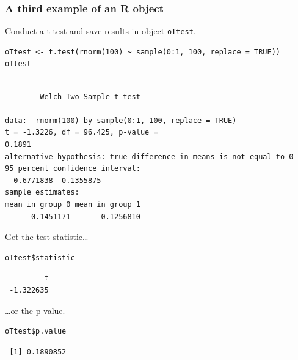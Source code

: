 \documentclass[bigger]{beamer}
\begin{document}
\begin{frame}[fragile,shrink = 20]
\frametitle{A third example of an R object}
\label{sec-1-1-10}

    Conduct a t-test and save results in object \texttt{oTtest}.


\lstset{language=R}
\begin{lstlisting}
oTtest <- t.test(rnorm(100) ~ sample(0:1, 100, replace = TRUE))
oTtest
\end{lstlisting}



\begin{verbatim}

        Welch Two Sample t-test

data:  rnorm(100) by sample(0:1, 100, replace = TRUE) 
t = -1.3226, df = 96.425, p-value =
0.1891
alternative hypothesis: true difference in means is not equal to 0 
95 percent confidence interval:
 -0.6771838  0.1355875 
sample estimates:
mean in group 0 mean in group 1 
     -0.1451171       0.1256810
\end{verbatim}


Get the test statistic\ldots


\lstset{language=R}
\begin{lstlisting}
oTtest$statistic
\end{lstlisting}

\begin{verbatim}
         t 
 -1.322635
\end{verbatim}

\ldots or the p-value.


\lstset{language=R}
\begin{lstlisting}
oTtest$p.value
\end{lstlisting}

\begin{verbatim}
 [1] 0.1890852
\end{verbatim}
\end{frame}
\end{document}
